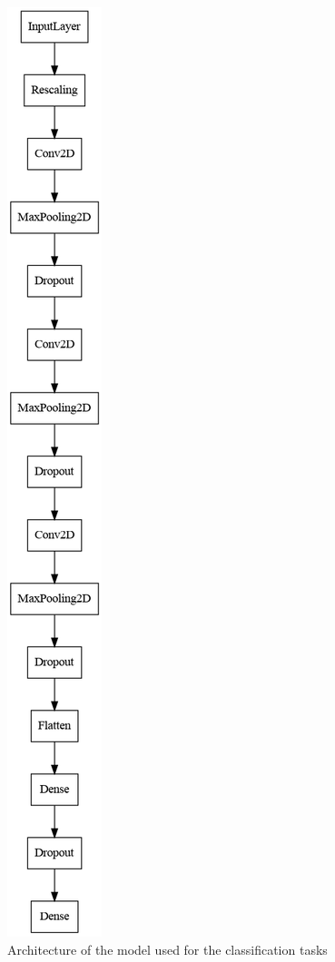 \begin{figure}[tb]
	\centering
	\includegraphics[height=0.6\textheight]{Bilder/model_architecture.png}
	\caption{Architecture of the model used for the classification tasks}
	\label{fig:model-architecture}
\end{figure}


